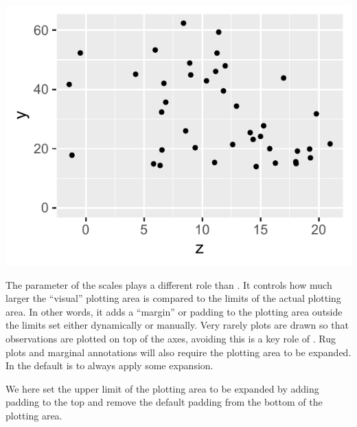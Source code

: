 \documentclass[krantz2]{krantz}\usepackage{knitr}
\begin{document}
\begin{knitrout}\footnotesize
{}\color{fgcolor}\begin{kframe}
\begin{alltt}
  \hlopt{+}
  \hlstd{()} \hlopt{+}
  \hlstd{(} \hlstd{=} \hlstd{,}  \hlstd{=} \hlstd{)}
\end{alltt}
\end{kframe}

{\centering \includegraphics[width=.54\textwidth]{figure/pos-scale-limits-04-1} 

}


\end{knitrout}

The  parameter of the scales plays a different role than . It controls how much larger the ``visual'' plotting area is compared to the limits of the actual plotting area. In other words, it adds a ``margin'' or padding to the plotting area outside the limits set either dynamically or manually. Very rarely plots are drawn so that observations are plotted on top of the axes, avoiding this is a key role of . Rug plots and marginal annotations will also require the plotting area to be expanded. In \ggplot the default is to always apply some expansion.

We here set the upper limit of the plotting area to be expanded by adding padding to the top and remove the default padding from the bottom of the plotting area.

\begin{knitrout}\footnotesize
{}\color{fgcolor}\begin{kframe}
\begin{alltt}
  \hlstd{(}      \hlopt{+}
  \hlstd{(} \hlstd{=} \hlstd{)} \hlopt{+}
  \hlstd{(} \hlstd{=} \hlstd{(} \hlstd{=} \hlstd{(}\hlstd{,} \hlstd{)))}
\end{alltt}
\end{kframe}
\end{knitrout}
\end{document}
